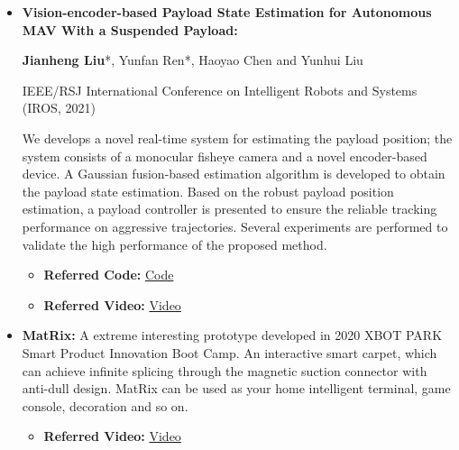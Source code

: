 \documentclass[11pt,a4paper,sans]{moderncv}        %
\begin{document}
\begin{CJK*}{UTF8}{gbsn}
{\begin{itemize}
\begin{itemize}
\item \textbf{Referred Code:} \href{https://github.com/jianhengLiu/VINS-RGBD-FAST}{Code}.
\end{itemize}
\vspace{6pt}
\vspace{6pt}

\item \textbf{Vision-encoder-based Payload State Estimation for Autonomous MAV With a Suspended Payload:} 

\textbf{Jianheng Liu}*, Yunfan Ren*, Haoyao Chen and Yunhui Liu

IEEE/RSJ International Conference on Intelligent Robots and Systems (IROS, 2021)

We develops a novel real-time system for estimating the payload position; the system consists of a monocular fisheye camera and a novel encoder-based device. A Gaussian fusion-based estimation algorithm is developed to obtain the payload state estimation. Based on the robust payload position estimation, a payload controller is presented to ensure the reliable tracking performance on aggressive trajectories. Several experiments are performed to validate the high performance of the proposed method. 

\begin{itemize}
\item \textbf{Referred Code:} \href{https://github.com/jianhengLiu/Vision-encoder-based-Payload-State-Estimator}{Code}
\item \textbf{Referred Video:} \href{https://www.bilibili.com/video/BV1Qq4y1U7n4?share_source=copy_web}{Video}
\end{itemize}
\vspace{6pt}

\item \textbf{MatRix:} A extreme interesting prototype developed in 2020 XBOT PARK Smart Product Innovation Boot Camp. An interactive smart carpet, which can achieve infinite splicing through the magnetic suction connector with anti-dull design. MatRix can be used as your home intelligent terminal, game console, decoration and so on.

\begin{itemize}
\item \textbf{Referred Video:} \href{https://www.bilibili.com/video/BV1gb4y127by?share_source=copy_web}{Video}
\end{itemize}

\vspace{6pt}


\end{itemize}}
\end{CJK*}
\end{document}

